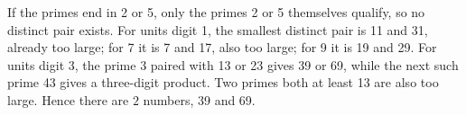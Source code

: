If the primes end in 2 or 5, only the primes 2 or 5 themselves qualify, so no distinct pair exists. For units digit 1, the smallest distinct pair is 11 and 31, already too large; for 7 it is 7 and 17, also too large; for 9 it is 19 and 29. For units digit 3, the prime 3 paired with 13 or 23 gives 39 or 69, while the next such prime 43 gives a three-digit product. Two primes both at least 13 are also too large. Hence there are $\boxed{2}$ numbers, 39 and 69.
